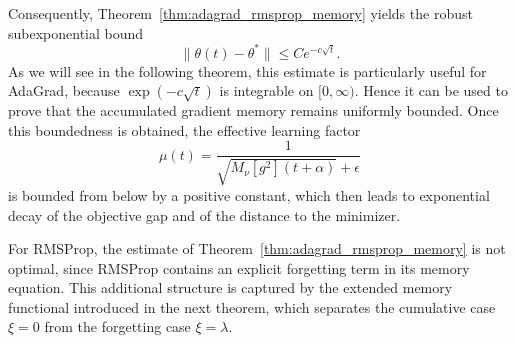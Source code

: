\documentclass{article} %
\begin{document}
Consequently, Theorem~\ref{thm:adagrad_rmsprop_memory} yields the robust subexponential bound
\[
\|\theta(t)-\theta^*\|
\le
C e^{-c\sqrt t}.
\]
As we will see in the following theorem, this estimate is particularly useful for AdaGrad, because \(\exp(-c\sqrt t)\) is integrable on \([0,\infty)\). Hence it can be used to prove that the accumulated gradient memory remains
uniformly bounded. Once this boundedness is obtained, the effective learning factor
\[
\mu(t)
=
\frac{1}{\sqrt{M_\nu[g^2](t+\alpha)}+\epsilon}
\]
is bounded from below by a positive constant, which then leads to exponential decay of the objective gap and of the distance to the minimizer.

For RMSProp, the estimate of Theorem~\ref{thm:adagrad_rmsprop_memory} is not optimal, since RMSProp contains an explicit forgetting term in its memory equation. This additional structure is
captured by the extended memory functional introduced in the next theorem, which separates the cumulative case \(\xi=0\) from the forgetting case \(\xi=\lambda\).
\end{document}
